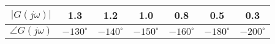 \begin{tabular}{|c|c|c|c|c|c|c|}
\hline $|G(j \omega)|$ & 1.3 & 1.2 & 1.0 & 0.8 & 0.5 & 0.3 \\
\hline $\angle G(j \omega)$ & $-130^{\circ}$ & $-140^{\circ}$ & $-150^{\circ}$ & $-160^{\circ}$ & $-180^{\circ}$ & $-200^{\circ}$ \\
\hline
\end{tabular}
